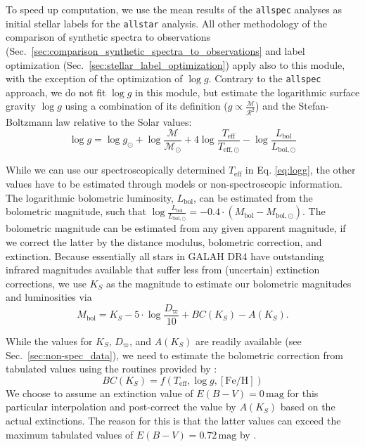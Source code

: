 \documentclass[
  journal=pasa,
  manuscript=research-paper, %
  year=2024,
  volume=37
]{cup-journal}
\newcommand{\logg}{$\log g$\xspace}
\begin{document}
To speed up computation, we use the mean results of the \texttt{allspec} analyses as initial stellar labels for the \texttt{allstar} analysis. All other methodology of the comparison of synthetic spectra to observations (Sec.~\ref{sec:comparison_synthetic_spectra_to_observations} and label optimization (Sec.~\ref{sec:stellar_label_optimization}) apply also to this module, with the exception of the optimization of \logg. Contrary to the \texttt{allspec} approach, we do not fit \logg in this module, but estimate the logarithmic surface gravity $\log g$ using a combination of its definition ($g \propto \frac{\mathcal{M}}{\mathcal{R}^2}$) and the Stefan-Boltzmann law relative to the Solar values:
\begin{equation}
\log g = \log g_\odot + \log \frac{\mathcal{M}}{\mathcal{M_\odot}} + 4 \log \frac{T_\mathrm{eff}}{T_\mathrm{eff,\odot}} - \log \frac{L_\mathrm{bol}}{L_\mathrm{bol,\odot}} \label{eq:logg}
\end{equation}

While we can use our spectroscopically determined $T_\mathrm{eff}$ in Eq. \ref{eq:logg}, the other values have to be estimated through models or non-spectroscopic information. The logarithmic bolometric luminosity, $L_\mathrm{bol}$, can be estimated from the bolometric magnitude, such that $\log \frac{L_\mathrm{bol}}{L_\mathrm{bol,\odot}} = -0.4 \cdot \left(M_\mathrm{bol} - M_\mathrm{bol,\odot} \right)$. The bolometric magnitude can be estimated from any given apparent magnitude, if we correct the latter by the distance modulus, bolometric correction, and extinction. Because essentially all stars in GALAH DR4 have outstanding infrared magnitudes available that suffer less from (uncertain) extinction corrections, we use $K_S$ as the magnitude to estimate our bolometric magnitudes and luminosities via
\begin{equation}
M_\mathrm{bol} = K_S - 5\cdot \log \frac{D_\varpi}{10} + BC(K_S) - A(K_S). \label{eq:mbol}
\end{equation}

While the values for $K_S$, $D_\varpi$, and $A(K_S)$ are readily available (see Sec.~\ref{sec:non-spec_data}), we need to estimate the bolometric correction from tabulated values using the routines provided by \citet{Casagrande2018}:
\begin{equation}
BC(K_S) = f(T_\mathrm{eff}, \log g, \mathrm{[Fe/H]})
\label{eq:bc_ks}
\end{equation}
We choose to assume an extinction value of $E(B-V) = 0\,\mathrm{mag}$ for this particular interpolation and post-correct the value by $A(K_S)$ based on the actual extinctions. The reason for this is that the latter values can exceed the maximum tabulated values of $E(B-V) = 0.72\,\mathrm{mag}$ by \citet{Casagrande2018}.
\end{document}
